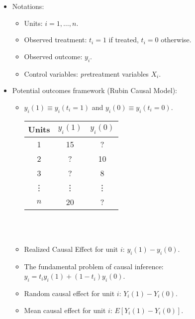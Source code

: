 \documentclass[20pt,landscape,pdftex]{foils}
\begin{document}

\hypersetup{pdfpagetransition=Replace}

\begin{itemize}

\item Notations:\pause
  \begin{itemize}
  \item Units:  $i=1,\dots,n$.\pause
  \item Observed treatment: $t_i=1$ if treated, $t_i=0$ otherwise.\pause
  \item Observed outcome: $y_i$.\pause
  \item Control variables: {\it pre}treatment variables $X_i$.\pause
  \end{itemize}
  
\item Potential outcomes framework (Rubin Causal Model): 
  \begin{itemize}
  \item $y_i(1) \equiv y_i(t_i=1)$ and $y_i(0) \equiv y_i(t_i=0)$.\pause  \\
    
    \begin{tabular}{ccc}
      Units & $y_i(1)$ & $y_i(0)$ \\
      \hline
      1 & 15  & ? \\
      2 &  ?  & 10 \\ 
      3 &  ?  & 8 \\
      \vdots & \vdots & \vdots \\
      $n$ & 20 & ? \\
      \hline
    \end{tabular} \pause \\ \\
    
  \item Realized Causal Effect for unit $i$: $y_i(1) - y_i(0)$.\pause
  \item The fundamental problem of causal inference: $y_i = t_i y_i(1) +
    (1-t_i)y_i(0)$.\pause
  \item Random causal effect for unit $i$: $Y_i(1) - Y_i(0).$\pause
  \item Mean causal effect for unit $i$: $E[Y_i(1) - Y_i(0)].$\pause
  \end{itemize}




\end{itemize}
\end{document}
